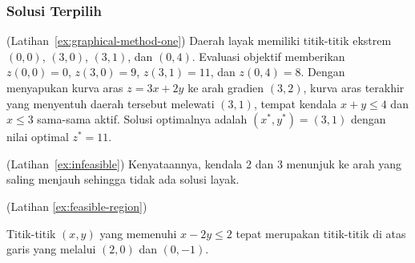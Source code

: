 %



\subsubsection*{Solusi Terpilih}
\label{solutions}

\begin{solution}(Latihan~\ref{ex:graphical-method-one})
Daerah layak memiliki titik-titik ekstrem $(0,0)$, $(3,0)$, $(3,1)$, dan $(0,4)$. Evaluasi objektif memberikan $z(0,0)=0$, $z(3,0)=9$, $z(3,1)=11$, dan $z(0,4)=8$. Dengan menyapukan kurva aras $z = 3x+2y$ ke arah gradien $(3,2)$, kurva aras terakhir yang menyentuh daerah tersebut melewati $(3,1)$, tempat kendala $x+y\leq 4$ dan $x\leq 3$ sama-sama aktif. Solusi optimalnya adalah $(x^*,y^*) = (3,1)$ dengan nilai optimal $z^* = 11$.
\end{solution}

\begin{solution}(Latihan~\ref{ex:infeasible})
Kenyataannya, kendala 2 dan 3 menunjuk ke arah yang saling menjauh sehingga tidak ada solusi layak.
\end{solution}

\begin{solution}(Latihan \ref{ex:feasible-region})

Titik-titik \((x,y)\) yang memenuhi \(x-2y \leq 2\) tepat merupakan titik-titik
di atas garis yang melalui \((2,0)\) dan \((0,-1)\).
\end{solution}

